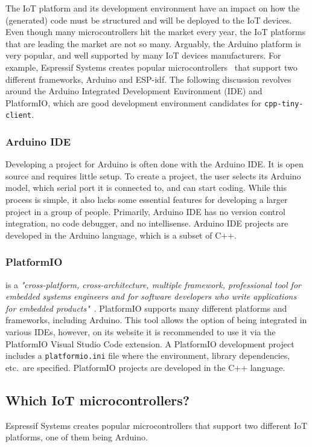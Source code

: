\documentclass[manuscript,screen]{acmart}
\begin{document}
The IoT platform and its development environment have an impact on how the (generated) code must be structured and will be deployed to the IoT devices. 
%
Even though many microcontrollers hit the market every year, the IoT platforms that are leading the market are not so many. 
Arguably, the Arduino platform is very popular, and well supported by many IoT devices manufacturers. For example, Espressif Systems creates popular microcontrollers~\cite{EspressifWorldLeading} that support two different frameworks, Arduino and ESP-idf. 
The following discussion revolves around the Arduino Integrated Development Environment (IDE) and PlatformIO, which are good development environment candidates for \texttt{cpp-tiny-client}. 


\subsubsection{Arduino IDE}
\cite{ArduinoIDE}
Developing a project for Arduino is often done with the Arduino IDE. It is open source and requires little setup. To create a project, the user selects its Arduino model, which serial port it is connected to, and can start coding. While this process is simple, it also lacks some essential features for developing a larger project in a group of people. Primarily, Arduino IDE has no version control integration, no code debugger, and no intellisense. Arduino IDE projects are developed in the Arduino language, which is a subset of C++. 

\subsubsection{PlatformIO}
\cite{PlatformIO} is a {\em "cross-platform, cross-architecture, multiple framework, professional tool for embedded systems engineers and for software developers who write applications for embedded products"}~\cite{WhatIsPlatformIO}. PlatformIO supports many different platforms and frameworks, including Arduino. This tool allows the option of being integrated in various IDEs, however, on its website it is recommended to use it via the PlatformIO Visual Studio Code extension. 
A PlatformIO development project includes a \texttt{platformio.ini} file where the environment, library dependencies, etc.\ are specified. PlatformIO projects are developed in the C++ language. 


\subsection{Which IoT microcontrollers?}\label{app:mc_compare}
Espressif Systems creates popular microcontrollers \cite{EspressifWorldLeading} that support two different IoT platforms, one of them being Arduino. 
\end{document}
